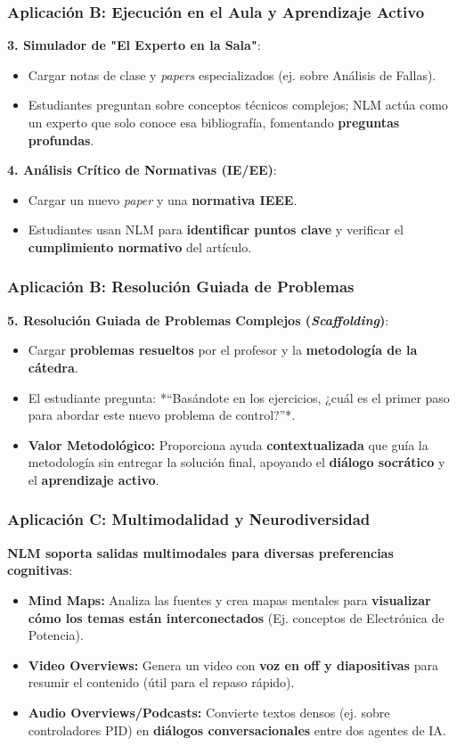 \documentclass[aspectratio=43]{beamer}
\begin{document}
\begin{frame}
\frametitle{ Aplicación B: Ejecución en el Aula y Aprendizaje Activo}

\textbf{3. Simulador de "El Experto en la Sala"}:
\begin{itemize}
    \item Cargar notas de clase y \textit{papers} especializados (ej. sobre Análisis de Fallas).
    \item Estudiantes preguntan sobre conceptos técnicos complejos; NLM actúa como un experto que solo conoce esa bibliografía, fomentando \textbf{preguntas profundas}.
\end{itemize}

\textbf{4. Análisis Crítico de Normativas (IE/EE)}:
\begin{itemize}
    \item Cargar un nuevo \textit{paper} y una \textbf{normativa IEEE}.
    \item Estudiantes usan NLM para \textbf{identificar puntos clave} y verificar el \textbf{cumplimiento normativo} del artículo.
\end{itemize}
\end{frame}

\begin{frame}
\frametitle{ Aplicación B: Resolución Guiada de Problemas}

\textbf{5. Resolución Guiada de Problemas Complejos (\textit{Scaffolding})}:
\begin{itemize}
    \item Cargar \textbf{problemas resueltos} por el profesor y la \textbf{metodología de la cátedra}.
    \item El estudiante pregunta: *“Basándote en los ejercicios, ¿cuál es el primer paso para abordar este nuevo problema de control?”*.
    \item \textbf{Valor Metodológico:} Proporciona ayuda \textbf{contextualizada} que guía la metodología sin entregar la solución final, apoyando el \textbf{diálogo socrático} y el \textbf{aprendizaje activo}.
\end{itemize}
\end{frame}

\begin{frame}
\frametitle{ Aplicación C: Multimodalidad y Neurodiversidad}

\textbf{NLM soporta salidas multimodales para diversas preferencias cognitivas}:
\begin{itemize}
    \item \textbf{Mind Maps:} Analiza las fuentes y crea mapas mentales para \textbf{visualizar cómo los temas están interconectados} (Ej. conceptos de Electrónica de Potencia).
    \item \textbf{Video Overviews:} Genera un video con \textbf{voz en off y diapositivas} para resumir el contenido (útil para el repaso rápido).
    \item \textbf{Audio Overviews/Podcasts:} Convierte textos densos (ej. sobre controladores PID) en \textbf{diálogos conversacionales} entre dos agentes de IA.
\end{itemize}
\end{frame}
\end{document}
